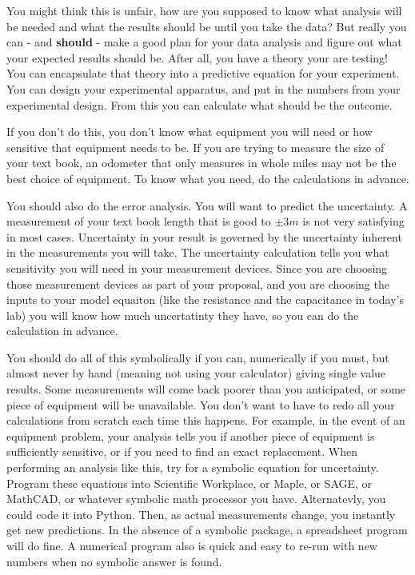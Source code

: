 You might think this is unfair, how are you supposed to know what analysis
will be needed and what the results should be until you take the data? But
really you can - and \textbf{should} - make a 
good plan for your data analysis and
figure out what your expected results should be. After all, you have a
theory your are testing! You can encapsulate that theory into a predictive
equation for your experiment. You can design your experimental apparatus,
and put in the numbers from your experimental design. From this you can
calculate what should be the outcome.

If you don't do this, you don't know what equipment you will need or how
sensitive that equipment needs to be. If you are trying to measure the size
of your text book, an odometer that only measures in whole miles may not be
the best choice of equipment. To know what you need, do the calculations in
advance.

You should also do the error analysis. You will want to predict the
uncertainty. A measurement of your text book length that is good to $\pm 3%
\unit{m}$ is not very satisfying in most cases. Uncertainty in your result
is governed by the uncertainty inherent in the measurements you will take.
The uncertainty calculation tells you what sensitivity you will need in your
measurement devices. Since you are choosing those measurement devices as
part of your proposal, and you are choosing the inputs to your model
equaiton (like the resistance and the capacitance in today's lab) you will
know how much uncertatinty they have, so you can do the calculation in
advance.

You should do all of this symbolically if you can, numerically if you must,
but almost never by hand (meaning not using your calculator) giving single
value results. Some measurements will come back poorer than you anticipated,
or some piece of equipment will be unavailable. You don't want to have to
redo all your calculations from scratch each time this happens. For example,
in the event of an equipment problem, your analysis tells you if another
piece of equipment is sufficiently sensitive, or if you need to find an
exact replacement. When performing an analysis like this, try for a symbolic
equation for uncertainty. Program these equations into Scientific
Workplace, or Maple, or SAGE, or MathCAD, or whatever symbolic math
processor you have. Alternatevly, you could code it into Python. Then, as
actual measurements change, you instantly get new predictions. In the absence
of a symbolic package, a spreadsheet program will do fine. A numerical
program also is quick and easy to re-run with new numbers when no symbolic
answer is found.

